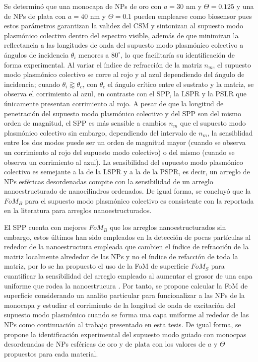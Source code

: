 Se determinó que una monocapa de NPs de oro con $a=30$ nm y $\Theta=0.125$ y una de NPs de plata con $a=40$ nm y $\Theta=0.1$ pueden emplearse como biosensor pues estos parámetros garantizan la validez del CSM y sintonizan al supuesto modo plasmónico colectivo dentro del espectro visible, además de que minimizan la reflectancia a las longitudes de onda del supuesto modo plasmónico colectivo a ángulos de incidencia $\theta_i$ menores a $80^\circ$, lo que facilitaría su identificación de forma experimental. Al variar el índice de refracción de la matriz $n_m$, el supuesto modo plasmónico colectivo se corre al rojo y al azul dependiendo del ángulo de incidencia; cuando $\theta_i\gtrapprox\theta_c$, con $\theta_c$ el ángulo crítico entre el sustrato y la matriz, se observa el corrimiento al azul, en contraste con el SPP, la LSPR y la PSLR que únicamente presentan corrimiento al rojo. A pesar de que la longitud de penetración del supuesto modo plasmónico colectivo y del SPP son del mismo orden de magnitud, el SPP es más sensible a cambios $n_m$ que el supuesto modo plasmónico colectivo sin embargo, dependiendo del intervalo de $n_m$, la sensiblidad entre los dos modos puede ser un orden de magnitud mayor (cuando se observa un corrimiento al rojo del supuesto modo colectivo) o del mismo (cuando se observa un corrimiento al azul). La sensibilidad del supuesto modo  plasmónico colectivo es semejante a la de la LSPR y a la de la PSPR, es decir, un arreglo de NPs esféricas desordenadas compite con la sensibilidad de un arreglo nanoestructurado de nanocilindros ordenados. De igual forma, se concluyó que la $\textit{FoM}_B$ para el supuesto modo plasmónico colectivo es consistente con la reportada en la literatura para arreglos nanoestructurados.

El SPP cuenta con mejores $\textit{FoM}_B$ que los arreglos nanoestructurados sin embargo, estos últimos han sido empleados en la detección de pocas partículas al rededor de la nanoestructura empleada que cambien el índice de refracción de la matriz localmente alrededor de las NPs y no el índice de refacción de toda la matriz, por lo se ha propuesto el uso de la FoM de superficie $\textit{FoM}_S$ para cuantificar la sensibilidad del arreglo empleado al aumentar el grosor de una capa uniforme que rodea la nanoestrucura \cite{estevez2014trends,svedendahl2009refractometric}. Por tanto, se propone calcular la FoM de superficie considerando un analito particular para funcionalizar a las NPs de la monocapa y estudiar el corrimiento de la longitud de onda de excitación del supuesto modo plasmónico cuando se forma una capa uniforme al rededor de las NPs como continuación al trabajo presentado en esta tesis. De igual forma, se propone la identificación experimental del supuesto modo guiado con monocpas desordenadas de NPs esféricas de oro y de plata con los valores de $a$ y $\Theta$ propuestos para cada material. 